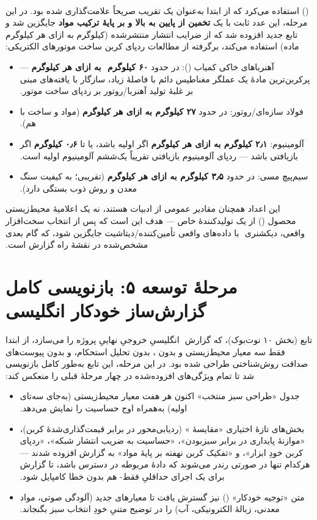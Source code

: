 ‫\documentclass[a4paper,12pt]{article}
\begin{document}
‫(\texttt{}) استفاده می‌کرد که از ابتدا به‌عنوان
‫یک تقریب صریحاً علامت‌گذاری شده بود. در این مرحله، این عدد ثابت با یک
‫\textbf{تخمین از پایین به بالا و بر پایهٔ ترکیب مواد} جایگزین شد و
‫تابع جدید \texttt{} افزوده شد
‫که از ضرایب انتشار منتشرشده (کیلوگرم  به ازای هر کیلوگرم
‫ماده) استفاده می‌کند، برگرفته از مطالعات ردپای کربن ساخت موتورهای
‫الکتریکی:
‫
‫\begin{itemize}
‫\item آهنرباهای خاکی کمیاب (): در حدود \textbf{۶۰ کیلوگرم
‫ به ازای هر کیلوگرم} — پرکربن‌ترین مادهٔ یک عملگر
‫مغناطیس دائم با فاصلهٔ زیاد، سازگار با یافته‌های  مبنی بر
‫غلبهٔ تولید آهنربا/روتور بر ردپای ساخت موتور.
‫\item فولاد سازه‌ای/روتور: در حدود \textbf{۲۷ کیلوگرم  به
‫ازای هر کیلوگرم} (مواد و ساخت با هم).
‫\item آلومینیوم: \textbf{۲٫۱ کیلوگرم  به ازای هر کیلوگرم}
‫اگر اولیه باشد، یا تا \textbf{۰٫۶ کیلوگرم} اگر بازیافتی باشد — ردپای
‫آلومینیوم بازیافتی تقریباً یک‌ششم آلومینیوم اولیه است.
‫\item سیم‌پیچ مسی: در حدود \textbf{۳٫۵ کیلوگرم  به ازای هر
‫کیلوگرم} (تقریبی؛ به کیفیت سنگ معدن و روش ذوب بستگی دارد).
‫\end{itemize}
‫
‫این اعداد همچنان مقادیر عمومی از ادبیات هستند، نه یک اعلامیهٔ محیط‌زیستی
‫محصول () از یک تولیدکنندهٔ خاص — هدف این است که پس از انتخاب
‫سخت‌افزار واقعی، دیکشنری
‫\texttt{} با داده‌های واقعی
‫تأمین‌کننده/دیتاشیت جایگزین شود، که گام بعدی مشخص‌شده در نقشهٔ راه
‫گزارش است.
‫
‫\section{مرحلهٔ توسعه ۵: بازنویسی کامل گزارش‌ساز خودکار انگلیسی}
‫تابع \texttt{} (بخش ۱۰ نوت‌بوک)، که گزارش
‫ انگلیسیِ خروجیِ نهاییِ پروژه را می‌سازد، از ابتدا فقط
‫سه معیار محیط‌زیستی و بدون ، بدون تحلیل استحکام، و بدون
‫پیوست‌های صداقت روش‌شناختی طراحی شده بود. در این مرحله، این تابع
‫به‌طور کامل بازنویسی شد تا تمام ویژگی‌های افزوده‌شده در چهار مرحلهٔ
‫قبلی را منعکس کند:
‫
‫\begin{itemize}
‫\item جدول «طراحی سبز منتخب» اکنون هر هفت معیار محیط‌زیستی (به‌جای
‫سه‌تای اولیه) به‌همراه اوج حساسیت  را نمایش می‌دهد.
‫\item بخش‌های تازهٔ اختیاری «مقایسهٔ » (ردیابی‌محور در
‫برابر قیمت‌گذاری‌شدهٔ کربن)، «موازنهٔ پایداری در برابر سبزبودن»،
‫«حساسیت به ضریب انتشار شبکه»، «ردپای کربن خودِ ابزار»، و «تفکیک
‫کربن نهفته بر پایهٔ مواد» به گزارش افزوده شدند — هرکدام تنها در
‫صورتی رندر می‌شوند که دادهٔ مربوطه در دسترس باشد، تا گزارش برای یک
‫اجرای حداقلیِ فقط- هم بدون خطا کامپایل شود.
‫\item متن «توجیه خودکار» () نیز گسترش یافت تا معیارهای
‫جدید (آلودگی صوتی، مواد معدنی، زبالهٔ الکترونیکی، آب) را در توضیح
‫متنیِ خودِ انتخاب سبز بگنجاند.
‫\end{itemize}
\end{document}
